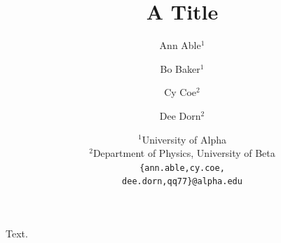 \documentclass{article}
\title{A Title}
\author{%
  Ann Able$^{1}$ \\
  \and
  Bo Baker$^{1}$ \\
  \and
  Cy Coe$^{2}$ \\
  \and
  Dee Dorn$^{2}$ \\
  \and
 {\normalfont $^1$University of Alpha} \\
 {\normalfont $^2$Department of Physics, University of Beta} \\
 \texttt{\{ann.able,cy.coe,}\\
 \texttt{dee.dorn,qq77\}@alpha.edu}
}
\begin{document}
\maketitle
Text.
\end{document}
